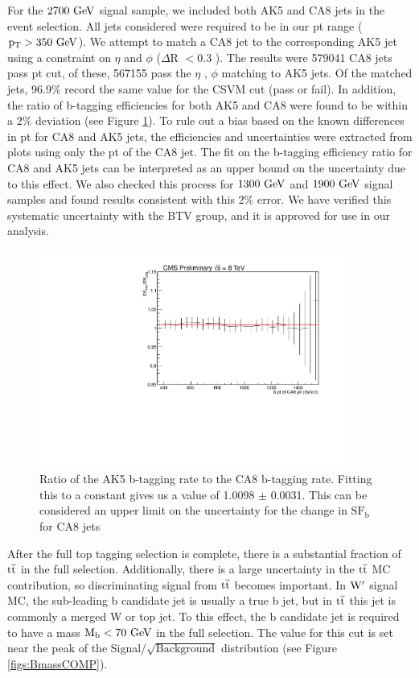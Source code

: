 For the $2700~\mathrm{GeV}$ signal sample, we 
included both AK5 and CA8 jets in the event selection.  All jets considered were required to be in our pt range ($\mathrm{p_{T}} > 350~\mathrm{GeV}$).  We attempt to match a CA8 jet to 
the corresponding AK5 jet using a constraint on $\eta$ and $\phi$ ($\Delta$R $< 0.3$ ).  The results were 579041 CA8 jets pass pt cut,
of these, 567155 pass the $\eta$ , $\phi$ matching to AK5 jets.  Of the matched jets, $96.9\%$ record the same value for the CSVM cut (pass or fail). In addition, 
the ratio of b-tagging efficiencies for both AK5 and CA8 were found to be within a $2\%$ deviation (see Figure \ref{figs:btageff}).  To rule out a bias based on the 
known differences in pt for CA8 and AK5 jets, the efficiencies and uncertainties were extracted from plots using only the pt of the CA8 jet.  
The fit on the b-tagging efficiency ratio for CA8 and AK5 jets can be interpreted as an upper bound on the uncertainty due to this effect.
We also checked this process for $1300~\mathrm{GeV}$ and $1900~\mathrm{GeV}$ signal samples and found results consistent with this $2\%$ error. 
We have verified this systematic uncertainty with the BTV group, and it is approved for use in our analysis.

\begin{figure}[htcb]
\centering
\includegraphics[width=0.9\textwidth]{AN-13-004/figs/EfficiencyCompCAptr32700.pdf}
\caption{Ratio of the AK5 b-tagging rate to the CA8 b-tagging rate. Fitting this to a constant gives us a value of 1.0098 $\pm$ 0.0031.  This can 
be considered an upper limit on the uncertainty for the change in $\mathrm{SF_b}$ for CA8 jets}

\label{figs:btageff}
\end{figure}

After the full top tagging selection is complete, there is a substantial fraction of $\mathrm{t\overline{t}}$ in the full selection.
Additionally, there is a large uncertainty in the $\mathrm{t\overline{t}}$ MC contribution, so discriminating signal from $\mathrm{t\overline{t}}$ becomes important.  
In $\mathrm{W}^\prime$ signal MC, the sub-leading b candidate jet is usually a true b jet, but in $\mathrm{t\overline{t}}$ this jet is commonly a merged W or top jet. 
To this effect, the b candidate jet is required to have a mass $\mathrm{M_b} < 70~\mathrm{GeV}$ in the full selection.  The value for this cut is set near the peak of the Signal/$\sqrt{\text{Background}}$ distribution (see Figure \ref{figs:BmassCOMP}).


